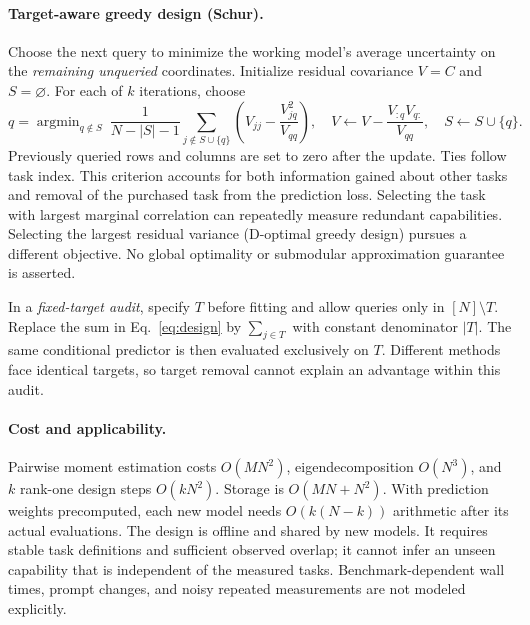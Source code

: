 \documentclass{article}
\begin{document}
\paragraph{Target-aware greedy design (Schur).}
Choose the next query to minimize the working model's average uncertainty on the \emph{remaining unqueried} coordinates. Initialize residual covariance $V=C$ and $S=\varnothing$. For each of $k$ iterations, choose
\begin{equation}
 q=\mathop{\arg\min}_{q\notin S}\ \frac{1}{N-|S|-1}
 \sum_{j\notin S\cup\{q\}}\left(V_{jj}-\frac{V_{jq}^2}{V_{qq}}\right),
 \quad V\leftarrow V-\frac{V_{:q}V_{q:}}{V_{qq}},\quad S\leftarrow S\cup\{q\}.
 \label{eq:design}
\end{equation}
Previously queried rows and columns are set to zero after the update. Ties follow task index. This criterion accounts for both information gained about other tasks and removal of the purchased task from the prediction loss. Selecting the task with largest marginal correlation can repeatedly measure redundant capabilities. Selecting the largest residual variance (D-optimal greedy design) pursues a different objective. No global optimality or submodular approximation guarantee is asserted.

In a \emph{fixed-target audit}, specify $T$ before fitting and allow queries only in $[N]\setminus T$. Replace the sum in Eq.~\eqref{eq:design} by $\sum_{j\in T}$ with constant denominator $|T|$. The same conditional predictor is then evaluated exclusively on $T$. Different methods face identical targets, so target removal cannot explain an advantage within this audit.

\paragraph{Cost and applicability.}
Pairwise moment estimation costs $O(MN^2)$, eigendecomposition $O(N^3)$, and $k$ rank-one design steps $O(kN^2)$. Storage is $O(MN+N^2)$. With prediction weights precomputed, each new model needs $O(k(N-k))$ arithmetic after its actual evaluations. The design is offline and shared by new models. It requires stable task definitions and sufficient observed overlap; it cannot infer an unseen capability that is independent of the measured tasks. Benchmark-dependent wall times, prompt changes, and noisy repeated measurements are not modeled explicitly.
\end{document}
